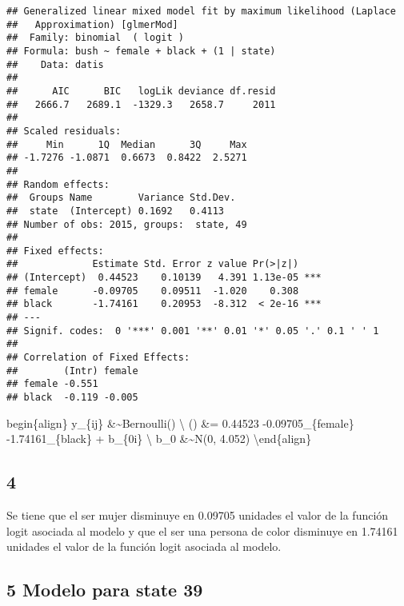 \documentclass[
]{article}
\newenvironment{Shaded}{\begin{snugshade}}{\end{snugshade}}
\newcommand{\DecValTok}[1]{\textcolor[rgb]{0.00,0.00,0.81}{#1}}
\newcommand{\FunctionTok}[1]{\textcolor[rgb]{0.00,0.00,0.00}{#1}}
\newcommand{\NormalTok}[1]{#1}
\newcommand{\OtherTok}[1]{\textcolor[rgb]{0.56,0.35,0.01}{#1}}
\newcommand{\SpecialCharTok}[1]{\textcolor[rgb]{0.00,0.00,0.00}{#1}}
\begin{document}
\begin{verbatim}
## Generalized linear mixed model fit by maximum likelihood (Laplace
##   Approximation) [glmerMod]
##  Family: binomial  ( logit )
## Formula: bush ~ female + black + (1 | state)
##    Data: datis
## 
##      AIC      BIC   logLik deviance df.resid 
##   2666.7   2689.1  -1329.3   2658.7     2011 
## 
## Scaled residuals: 
##     Min      1Q  Median      3Q     Max 
## -1.7276 -1.0871  0.6673  0.8422  2.5271 
## 
## Random effects:
##  Groups Name        Variance Std.Dev.
##  state  (Intercept) 0.1692   0.4113  
## Number of obs: 2015, groups:  state, 49
## 
## Fixed effects:
##             Estimate Std. Error z value Pr(>|z|)    
## (Intercept)  0.44523    0.10139   4.391 1.13e-05 ***
## female      -0.09705    0.09511  -1.020    0.308    
## black       -1.74161    0.20953  -8.312  < 2e-16 ***
## ---
## Signif. codes:  0 '***' 0.001 '**' 0.01 '*' 0.05 '.' 0.1 ' ' 1
## 
## Correlation of Fixed Effects:
##        (Intr) female
## female -0.551       
## black  -0.119 -0.005
\end{verbatim}

begin\{align\} y\_\{ij\} \&\sim  Bernoulli()
\textbackslash{} () \&= 0.44523
-0.09705\_\{female\} -1.74161\_\{black\} + b\_\{0i\} \textbackslash{}
b\_0 \&\sim N(0, 4.052) \textbackslash end\{align\}

\hypertarget{section-3}{%
\subsection{4}\label{section-3}}

Se tiene que el ser mujer disminuye en 0.09705 unidades el valor de la
función logit asociada al modelo y que el ser una persona de color
disminuye en 1.74161 unidades el valor de la función logit asociada al
modelo.

\hypertarget{modelo-para-state-39}{%
\subsection{5 Modelo para state 39}\label{modelo-para-state-39}}

\begin{Shaded}
\end{Shaded}
\end{document}
